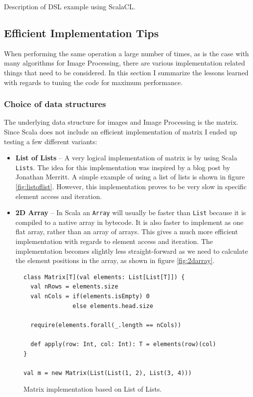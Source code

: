 \documentclass[a4paper,english]{report}
\begin{document}
Description of DSL example using ScalaCL.

\subsection{Efficient Implementation Tips}
\label{sec:effimpl}

When performing the same operation a large number of times, as is the
case with many algorithms for Image Processing, there are various
implementation related things that need to be considered. In this
section I summarize the lessons learned with regards to tuning the
code for maximum performance.

\subsubsection{Choice of data structures}
\label{sec:datastructures}

The underlying data structure for images and Image Processing is the
matrix. Since Scala does not include an efficient implementation of
matrix I ended up testing a few different variants:

\begin{itemize}
\item \textbf{List of Lists} -- A very logical implementation of
  matrix is by using Scala \texttt{Lists}. The idea for this
  implementation was inspired by a blog post by Jonathan
  Merritt\cite{mer08}. A simple example of using a list of lists is
  shown in figure \vref{fig:listoflist}. However, this implementation
  proves to be very slow in specific element access and iteration.
\item \textbf{2D Array} -- In Scala an \texttt{Array} will usually be
  faster than \texttt{List} because it is compiled to a native array
  in bytecode. It is also faster to implement as one flat array,
  rather than an array of arrays. This gives a much more efficient
  implementation with regards to element access and iteration. The
  implementation becomes slightly less straight-forward as we need to
  calculate the element positions in the array, as shown in figure
  \vref{fig:2darray}.
\end{itemize}

\begin{figure}
  \begin{lstlisting}
class Matrix[T](val elements: List[List[T]]) {
  val nRows = elements.size
  val nCols = if(elements.isEmpty) 0
              else elements.head.size

  require(elements.forall(_.length == nCols))

  def apply(row: Int, col: Int): T = elements(row)(col)
}

val m = new Matrix(List(List(1, 2), List(3, 4)))
  \end{lstlisting}
  \caption{Matrix implementation based on List of
    Lists.\label{fig:listoflist}}
\end{figure}
\end{document}
